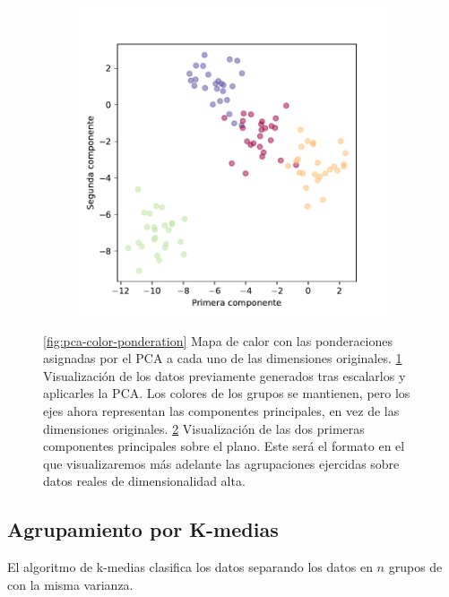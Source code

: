 \begin{figure}[]
\begin{subfigure}{0.45\textwidth}
    \caption{}
    \label{fig:pca-3d-labeled}
  \end{subfigure}
  \begin{subfigure}{0.45\textwidth}
    \centering
    \includegraphics[width=\textwidth]{figures/pca-labeled.pdf}
    \caption{}
    \label{fig:pca-labeled}
  \end{subfigure}
  \caption[Probando un PCA.]{\ref{fig:pca-color-ponderation} Mapa de calor con las ponderaciones asignadas por el PCA a cada uno de las dimensiones originales. \ref{fig:pca-3d-labeled} Visualización de los datos previamente generados tras escalarlos y aplicarles la PCA. Los colores de los grupos se mantienen, pero los ejes ahora representan las componentes principales, en vez de las dimensiones originales. \ref{fig:pca-labeled} Visualización de las dos primeras componentes principales sobre el plano. Este será el formato en el que visualizaremos más adelante las agrupaciones ejercidas sobre datos reales de dimensionalidad alta.}
  \label{fig:pca}
\end{figure}

\newpage
\subsection{Agrupamiento por K-medias}

El algoritmo de k-medias clasifica los datos separando los datos en $n$ grupos de con la misma varianza.

